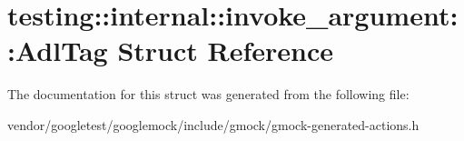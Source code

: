 \hypertarget{structtesting_1_1internal_1_1invoke__argument_1_1AdlTag}{}\section{testing\+:\+:internal\+:\+:invoke\+\_\+argument\+:\+:Adl\+Tag Struct Reference}
\label{structtesting_1_1internal_1_1invoke__argument_1_1AdlTag}


The documentation for this struct was generated from the following file\+:\begin{DoxyCompactItemize}
\item 
vendor/googletest/googlemock/include/gmock/gmock-\/generated-\/actions.\+h\end{DoxyCompactItemize}
